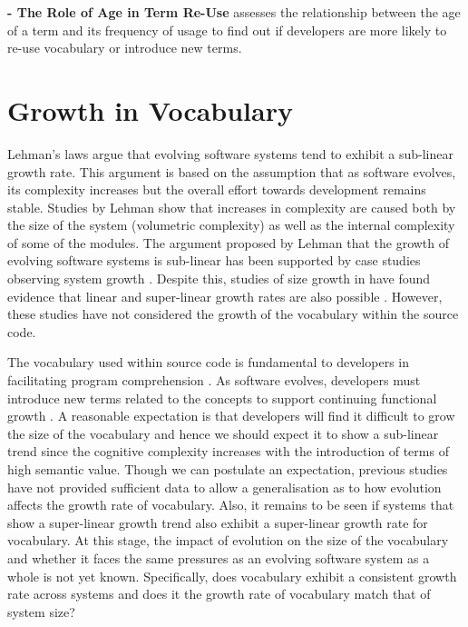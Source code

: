 \textbf{ - The Role of Age in Term Re-Use} assesses the relationship between the age of a term and its frequency of usage to find out if developers are more likely to re-use vocabulary or introduce new terms.

\section{Growth in Vocabulary} %
\label{sec:growth_in_vocabulary}

Lehman's laws \cite{Lehman97a} argue that evolving software systems tend to exhibit a sub-linear growth rate. This argument is based on the assumption that as software evolves, its complexity increases but the overall effort towards development remains stable. Studies by Lehman \etal \cite{Lehman97a} show that increases in complexity are caused both by the size of the system (volumetric complexity) as well as the internal complexity of some of the modules. The argument proposed by Lehman that the growth of evolving software systems is sub-linear has been supported by case studies observing system growth \cite{DAmbros07a, Gall97a, Lehman97a}. Despite this, studies of size growth in {\OSYS} have found evidence that linear and super-linear growth rates are also possible \cite{Godfrey01a,Israeli09a,Succi01a}. However, these studies have not considered the growth of the vocabulary within the source code.

The vocabulary used within source code is fundamental to developers in facilitating program comprehension \cite{Rajlich02a}. As software evolves, developers must introduce new terms related to the concepts to support continuing functional growth \cite{Hsi02a}. A reasonable expectation is that developers will find it difficult to grow the size of the vocabulary and hence we should expect it to show a sub-linear trend since the cognitive complexity increases with the introduction of terms of high semantic value. Though we can postulate an expectation, previous studies have not provided sufficient data to allow a generalisation as to how evolution affects the growth rate of vocabulary. Also, it remains to be seen if systems that show a super-linear growth trend also exhibit a super-linear growth rate for vocabulary. At this stage, the impact of evolution on the size of the vocabulary and whether it faces the same pressures as an evolving software system as a whole is not yet known. Specifically, does vocabulary exhibit a consistent growth rate across systems and does it the growth rate of vocabulary match that of system size?

